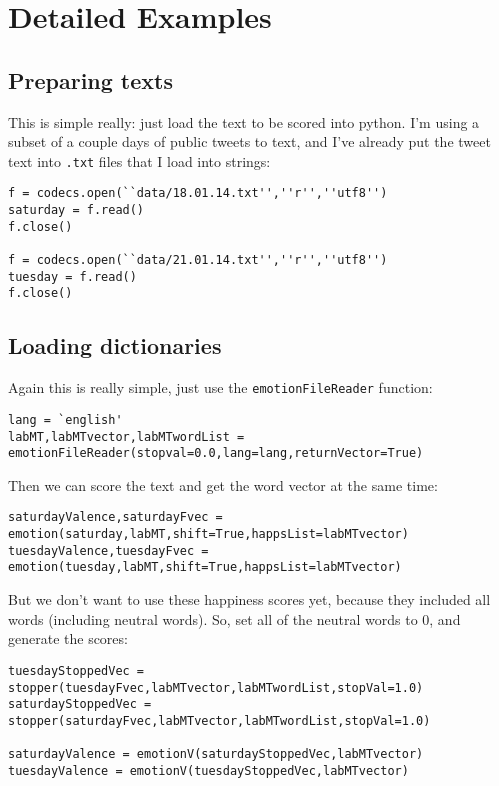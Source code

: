 \section{Detailed Examples}
\label{detailed-example::doc}\label{detailed-example:detailed-examples}

\subsection{Preparing texts}
\label{detailed-example:preparing-texts}
This is simple really: just load the text to be scored into python.
I'm using a subset of a couple days of public tweets to text, and I've already put the tweet text into \lstinline{.txt} files that I load into strings:
\begin{lstlisting}
f = codecs.open(``data/18.01.14.txt'',''r'',''utf8'')
saturday = f.read()
f.close()

f = codecs.open(``data/21.01.14.txt'',''r'',''utf8'')
tuesday = f.read()
f.close()
\end{lstlisting}


\subsection{Loading dictionaries}
\label{detailed-example:loading-dictionaries}
Again this is really simple, just use the \lstinline{emotionFileReader} function:
\begin{lstlisting}
lang = `english'
labMT,labMTvector,labMTwordList = emotionFileReader(stopval=0.0,lang=lang,returnVector=True)
\end{lstlisting}

Then we can score the text and get the word vector at the same time:
\begin{lstlisting}
saturdayValence,saturdayFvec = emotion(saturday,labMT,shift=True,happsList=labMTvector)
tuesdayValence,tuesdayFvec = emotion(tuesday,labMT,shift=True,happsList=labMTvector)
\end{lstlisting}

But we don't want to use these happiness scores yet, because they included all words (including neutral words).
So, set all of the neutral words to 0, and generate the scores:
\begin{lstlisting}
tuesdayStoppedVec = stopper(tuesdayFvec,labMTvector,labMTwordList,stopVal=1.0)
saturdayStoppedVec = stopper(saturdayFvec,labMTvector,labMTwordList,stopVal=1.0)

saturdayValence = emotionV(saturdayStoppedVec,labMTvector)
tuesdayValence = emotionV(tuesdayStoppedVec,labMTvector)
\end{lstlisting}



